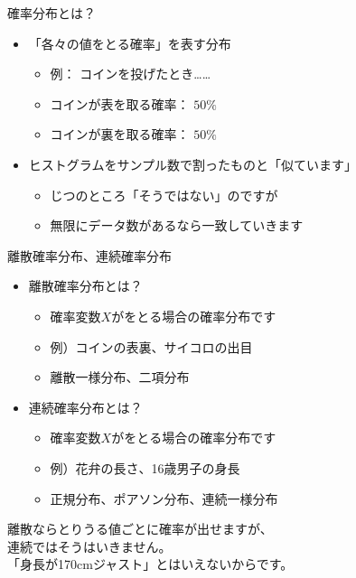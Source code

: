 \documentclass[dvipdfmx,cjk]{beamer}
\begin{document}
\begin{frame}{確率分布とは？} \pause

\begin{itemize}

    \item 「各々の値をとる確率」を表す分布
        \begin{itemize}
        \item 例： コインを投げたとき……
        \item コインが表を取る確率： $50\%$
        \item コインが裏を取る確率： $50\%$  \pause
        \end{itemize}

    \item ヒストグラムをサンプル数で割ったものと「似ています」
        \begin{itemize}
        \item じつのところ「そうではない」のですが
        \item 無限にデータ数があるなら一致していきます
        \end{itemize}

\end{itemize}

\end{frame}


\begin{frame}{離散確率分布、連続確率分布} \pause

\begin{itemize}

    \item 離散確率分布とは？ \pause
        \begin{itemize}
        \item 確率変数$X$がをとる場合の確率分布です \pause
        \item 例）コインの表裏、サイコロの出目  \pause
        \item 離散一様分布、二項分布 \pause
        \end{itemize}

    \item 連続確率分布とは？ \pause
        \begin{itemize}
        \item 確率変数$X$がをとる場合の確率分布です \pause
        \item 例）花弁の長さ、16歳男子の身長 \pause
        \item 正規分布、ポアソン分布、連続一様分布 \pause
        \end{itemize}

\end{itemize}

\vskip 1cm

離散ならとりうる値ごとに確率が出せますが、\\
連続ではそうはいきません。\\ \pause
「身長が170cmジャスト」とはいえないからです。

\end{frame}
\end{document}
